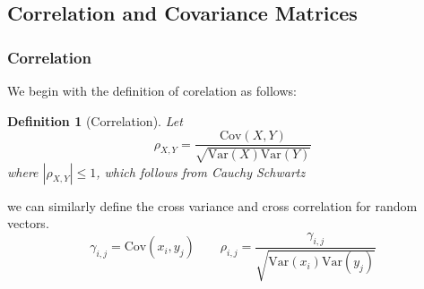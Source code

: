 \documentclass[12pt]{article}
\newtheorem{definition}{Definition}
\newcommand{\Var}{\text{Var}}
\newcommand{\Cov}{\text{Cov}}
\begin{document}
\subsection{Correlation and Covariance Matrices}
\subsubsection{Correlation}
We begin with the definition of corelation as follows:
\begin{definition}[Correlation]
Let 
\[
	\rho_{X, Y} = \frac{\Cov(X, Y)}{\sqrt{\Var(X) \Var(Y)}}
\]
where $|\rho_{X, Y}| \leq 1$, which follows from Cauchy Schwartz
\end{definition}
we can similarly define the cross variance and cross correlation for random vectors. 
\[
	\gamma_{i,j} = \Cov(x_i, y_j) \qquad \rho_{i,j} = \frac{\gamma_{i,j}}{\sqrt{\Var(x_i)\Var(y_j)}}
\]
\end{document}
